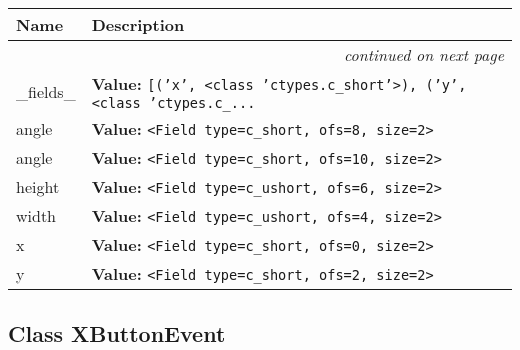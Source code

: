     \vspace{-1cm}
\hspace{\varindent}\begin{longtable}{|p{\varnamewidth}|p{\vardescrwidth}|l}
\cline{1-2}
\cline{1-2} \centering \textbf{Name} & \centering \textbf{Description}& \\
\cline{1-2}
\endhead\cline{1-2}\multicolumn{3}{r}{\small\textit{continued on next page}}\\\endfoot\cline{1-2}
\endlastfoot\raggedright \_\-f\-i\-e\-l\-d\-s\-\_\- & \raggedright \textbf{Value:} 
{\tt \texttt{[}\texttt{(}\texttt{'}\texttt{x}\texttt{'}\texttt{, }{\textless}class 'ctypes.c\_short'{\textgreater}\texttt{)}\texttt{, }\texttt{(}\texttt{'}\texttt{y}\texttt{'}\texttt{, }{\textless}class 'ctypes.c\_\texttt{...}}&\\
\cline{1-2}
\raggedright a\-n\-g\-l\-e\-1\- & \raggedright \textbf{Value:} 
{\tt {\textless}Field type=c\_short, ofs=8, size=2{\textgreater}}&\\
\cline{1-2}
\raggedright a\-n\-g\-l\-e\-2\- & \raggedright \textbf{Value:} 
{\tt {\textless}Field type=c\_short, ofs=10, size=2{\textgreater}}&\\
\cline{1-2}
\raggedright h\-e\-i\-g\-h\-t\- & \raggedright \textbf{Value:} 
{\tt {\textless}Field type=c\_ushort, ofs=6, size=2{\textgreater}}&\\
\cline{1-2}
\raggedright w\-i\-d\-t\-h\- & \raggedright \textbf{Value:} 
{\tt {\textless}Field type=c\_ushort, ofs=4, size=2{\textgreater}}&\\
\cline{1-2}
\raggedright x\- & \raggedright \textbf{Value:} 
{\tt {\textless}Field type=c\_short, ofs=0, size=2{\textgreater}}&\\
\cline{1-2}
\raggedright y\- & \raggedright \textbf{Value:} 
{\tt {\textless}Field type=c\_short, ofs=2, size=2{\textgreater}}&\\
\cline{1-2}
\end{longtable}



\subsection{Class XButtonEvent}

